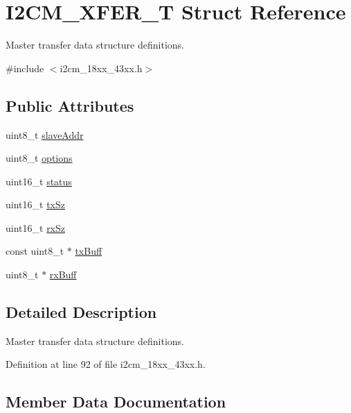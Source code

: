 \hypertarget{struct_i2_c_m___x_f_e_r___t}{}\section{I2\+C\+M\+\_\+\+X\+F\+E\+R\+\_\+T Struct Reference}
\label{struct_i2_c_m___x_f_e_r___t}


Master transfer data structure definitions.  




{\ttfamily \#include $<$i2cm\+\_\+18xx\+\_\+43xx.\+h$>$}

\subsection*{Public Attributes}
\begin{DoxyCompactItemize}
\item 
uint8\+\_\+t \hyperlink{struct_i2_c_m___x_f_e_r___t_a674496757553522628b725c4de372c59}{slave\+Addr}
\item 
uint8\+\_\+t \hyperlink{struct_i2_c_m___x_f_e_r___t_a266448d1d714cc74663c25e1eaa8b91b}{options}
\item 
uint16\+\_\+t \hyperlink{struct_i2_c_m___x_f_e_r___t_ac8151ea4555b8a05bbc2808f7b418076}{status}
\item 
uint16\+\_\+t \hyperlink{struct_i2_c_m___x_f_e_r___t_ac5cf574f3cfeade1ff3618a1dcd516e0}{tx\+Sz}
\item 
uint16\+\_\+t \hyperlink{struct_i2_c_m___x_f_e_r___t_a3258d00dfd77755e7d2b397d87746733}{rx\+Sz}
\item 
const uint8\+\_\+t $\ast$ \hyperlink{struct_i2_c_m___x_f_e_r___t_a14a9cf03095629facbeee4863399f31f}{tx\+Buff}
\item 
uint8\+\_\+t $\ast$ \hyperlink{struct_i2_c_m___x_f_e_r___t_a8005cf7efb0ff7ed4d7951c963b0eaa5}{rx\+Buff}
\end{DoxyCompactItemize}


\subsection{Detailed Description}
Master transfer data structure definitions. 

Definition at line 92 of file i2cm\+\_\+18xx\+\_\+43xx.\+h.



\subsection{Member Data Documentation}
\mbox{\label{struct_i2_c_m___x_f_e_r___t_a266448d1d714cc74663c25e1eaa8b91b}} 
